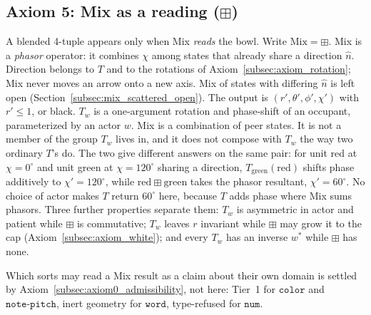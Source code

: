 \documentclass[12pt, a4paper]{article}
\begin{document}
\subsection{Axiom 5: Mix as a reading (\texorpdfstring{$\boxplus$}{boxplus})}
\label{subsec:axiom_interference}
A blended 4-tuple appears only when Mix \emph{reads} the bowl.
Write $\mathrm{Mix}=\boxplus$. Mix is a \emph{phasor} operator: it
combines $\chi$ among states that already share a direction $\hat n$.
Direction belongs to $T$ and to the rotations of
Axiom~\ref{subsec:axiom_rotation}; Mix never moves an arrow onto a new
axis. Mix of states with differing $\hat n$ is left open
(Section~\ref{subsec:mix_scattered_open}). The output is
$(r',\theta',\phi',\chi')$ with $r'\le 1$, or black.
$T_w$ is a one-argument rotation and phase-shift of an occupant,
parameterized by an actor $w$. Mix is a combination of
peer states. It is not a member of the group $T_w$ lives in, and it
does not compose with $T_w$ the way two ordinary $T$'s do. The two
give different answers on the same pair: for unit red at $\chi=0^\circ$
and unit green at $\chi=120^\circ$ sharing a direction,
$T_{\mathrm{green}}(\mathrm{red})$ shifts phase additively to
$\chi'=120^\circ$, while $\mathrm{red}\boxplus\mathrm{green}$ takes the
phasor resultant, $\chi'=60^\circ$. No choice of actor makes $T$
return $60^\circ$ here, because $T$ adds phase where Mix sums phasors.
Three further properties separate them: $T_w$ is asymmetric in actor
and patient while $\boxplus$ is commutative; $T_w$ leaves $r$ invariant
while $\boxplus$ may grow it to the cap
(Axiom~\ref{subsec:axiom_white}); and every $T_w$ has an inverse
$w^{*}$ while $\boxplus$ has none.

Which sorts may read a Mix result as a claim about their own domain is
settled by Axiom~\ref{subsec:axiom0_admissibility}, not here: Tier~1
for $\mathtt{color}$ and $\mathtt{note\text{-}pitch}$, inert geometry
for $\mathtt{word}$, type-refused for $\mathtt{num}$.
\end{document}
